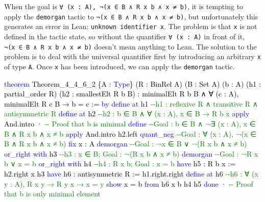 \documentclass[
  letterpaper,
  DIV=11,
  numbers=noendperiod]{scrreprt}
\newenvironment{Shaded}{\begin{snugshade}}{\end{snugshade}}
\newcommand{\CommentTok}[1]{\textcolor[rgb]{0.37,0.37,0.37}{#1}}
\newcommand{\KeywordTok}[1]{\textcolor[rgb]{0.00,0.23,0.31}{#1}}
\newcommand{\NormalTok}[1]{\textcolor[rgb]{0.00,0.23,0.31}{#1}}
\renewcommand{\NormalTok}[1]{\textcolor[HTML]{000000}{#1}}
\renewcommand{\KeywordTok}[1]{\textcolor[HTML]{0000FF}{#1}}
\renewcommand{\CommentTok}[1]{\textcolor[HTML]{008000}{#1}}
\theoremstyle{remark}
\begin{document}
When the goal is
\texttt{∀\ (x\ :\ A),\ ¬(x\ ∈\ B\ ∧\ R\ x\ b\ ∧\ x\ ≠\ b)}, it is
tempting to apply the \texttt{demorgan} tactic to
\texttt{¬(x\ ∈\ B\ ∧\ R\ x\ b\ ∧\ x\ ≠\ b)}, but unfortunately this
generates an error in Lean:
\texttt{unknown\ identifier\ \textquotesingle{}x\textquotesingle{}}. The
problem is that \texttt{x} is not defined in the tactic state, so
without the quantifier \texttt{∀\ (x\ :\ A)} in front of it,
\texttt{¬(x\ ∈\ B\ ∧\ R\ x\ b\ ∧\ x\ ≠\ b)} doesn't mean anything to
Lean. The solution to the problem is to deal with the universal
quantifier first by introducing an arbitrary \texttt{x} of type
\texttt{A}. Once \texttt{x} has been introduced, we can apply the
\texttt{demorgan} tactic.

\begin{Shaded}
\begin{Highlighting}[]
\KeywordTok{theorem}\NormalTok{ Theorem\_4\_4\_6\_2 \{A : }\KeywordTok{Type}\NormalTok{\} (R : BinRel A) (B : Set A) (b : A)}
\NormalTok{    (h1 : partial\_order R) (h2 : smallestElt R b B) :}
\NormalTok{    minimalElt R b B ∧ ∀ (c : A), minimalElt R c B → b = c := }\KeywordTok{by}
  \KeywordTok{define} \KeywordTok{at}\NormalTok{ h1     }\CommentTok{{-}{-}h1 : reflexive R ∧ transitive R ∧ antisymmetric R}
  \KeywordTok{define} \KeywordTok{at}\NormalTok{ h2     }\CommentTok{{-}{-}h2 : b ∈ B ∧ ∀ (x : A), x ∈ B → R b x}
  \KeywordTok{apply}\NormalTok{ And.intro}
\NormalTok{  · }\CommentTok{{-}{-} Proof that b is minimal}
    \KeywordTok{define}           \CommentTok{{-}{-}Goal : b ∈ B ∧ ¬∃ (x : A), x ∈ B ∧ R x b ∧ x ≠ b}
    \KeywordTok{apply}\NormalTok{ And.intro h2.left}
    \KeywordTok{quant\_neg}        \CommentTok{{-}{-}Goal : ∀ (x : A), ¬(x ∈ B ∧ R x b ∧ x ≠ b)}
    \KeywordTok{fix}\NormalTok{ x : A}
    \KeywordTok{demorgan}         \CommentTok{{-}{-}Goal : ¬x ∈ B ∨ ¬(R x b ∧ x ≠ b)}
    \KeywordTok{or\_right} \KeywordTok{with}\NormalTok{ h3 }\CommentTok{{-}{-}h3 : x ∈ B; Goal : ¬(R x b ∧ x ≠ b)}
    \KeywordTok{demorgan}         \CommentTok{{-}{-}Goal : ¬R x b ∨ x = b}
    \KeywordTok{or\_right} \KeywordTok{with}\NormalTok{ h4 }\CommentTok{{-}{-}h4 : R x b; Goal : x = b}
    \KeywordTok{have}\NormalTok{ h5 : R b x := h2.right x h3}
    \KeywordTok{have}\NormalTok{ h6 : antisymmetric R := h1.right.right}
    \KeywordTok{define} \KeywordTok{at}\NormalTok{ h6     }\CommentTok{{-}{-}h6 : ∀ (x y : A), R x y → R y x → x = y}
    \KeywordTok{show}\NormalTok{ x = b }\KeywordTok{from}\NormalTok{ h6 x b h4 h5}
    \KeywordTok{done}
\NormalTok{  · }\CommentTok{{-}{-} Proof that b is only minimal element}

\end{Highlighting}
\end{Shaded}
\end{document}
